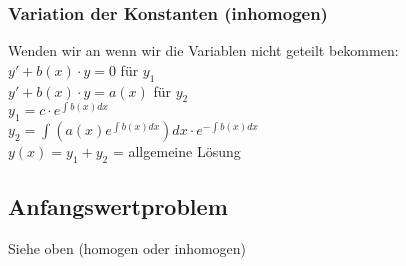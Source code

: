 \documentclass[a4paper, 8pt, landscape]{extarticle}
\let\oldint\int
\renewcommand{\int}{\ensuremath{\textstyle\oldint}}
\begin{document}
\begin{multicols*}{5}
			\subsubsection{Variation der Konstanten (inhomogen)}
				Wenden wir an wenn wir die Variablen nicht geteilt bekommen:\\
				$y'+b(x)\cdot y=0$ für $y_1$\\
				$y'+b(x)\cdot y=a(x)$ für $y_2$\\
				
				$y_1 = c\cdot e^{\int b(x)dx}$\\
				$y_2 = \int(a(x)e^{\int b(x)dx})dx\cdot e^{-\int b(x)dx}$\\
				
				$y(x)=y_1+y_2$ = allgemeine Lösung
			\subsection{Anfangswertproblem}
				Siehe oben (homogen oder inhomogen)

\end{multicols*}
\end{document}
